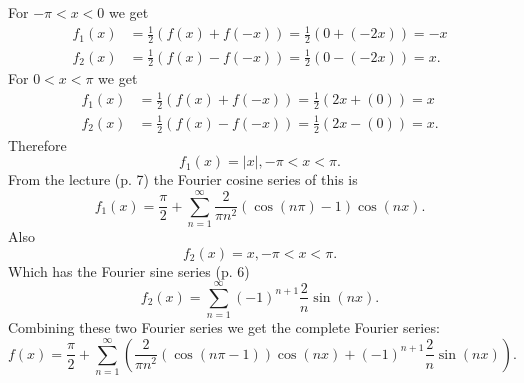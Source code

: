 \begin{derivation}
  For $-\pi < x < 0$ we get
  \begin{align*}
    f_1(x) &= \frac{1}{2} \left( f(x) + f(-x) \right) = \frac{1}{2} \left( 0 + (-2x) \right) = -x \\
    f_2(x) &= \frac{1}{2} \left( f(x) - f(-x) \right) = \frac{1}{2} \left( 0 - (-2x) \right) = x
  .\end{align*}
  For $0 < x< \pi$ we get
  \begin{align*}
    f_1(x) &= \frac{1}{2} \left( f(x) + f(-x) \right) = \frac{1}{2} \left( 2x + (0) \right) = x \\
    f_2(x) &= \frac{1}{2} \left( f(x) - f(-x) \right) = \frac{1}{2} \left( 2x - (0) \right) = x
  .\end{align*}
  Therefore
  \begin{equation*}
    f_1(x) = \left| x \right|, -\pi < x < \pi
  .\end{equation*}
  From the lecture (p. 7) the Fourier cosine series of this is
  \begin{equation*}
    f_1(x) = \frac{\pi}{2} + \sum_{n = 1}^{\infty} \frac{2}{\pi n^2} \left( \cos(n\pi) - 1 \right) \cos (nx)
  .\end{equation*}
  Also
  \begin{equation*}
    f_2(x) = x, -\pi<x<\pi
  .\end{equation*}
  Which has the Fourier sine series (p. 6)
  \begin{equation*}
    f_2(x) = \sum_{n = 1}^{\infty} \left( -1 \right)^{n+1}  \frac{2}{n} \sin (nx)
  .\end{equation*}
  Combining these two Fourier series we get the complete Fourier series:
  \begin{equation*}
    f(x) = \frac{\pi}{2} + \sum_{n = 1}^{\infty} \left( \frac{2}{\pi n^2} \left( \cos(n\pi - 1) \right) \cos(nx) + \left( -1 \right)^{n+1} \frac{2}{n} \sin (nx) \right)
  .\end{equation*}
\end{derivation}


